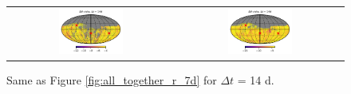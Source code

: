 \documentclass[preprintm,linenumbers]{aastex631}
\begin{document}
\begin{figure}
\begin{tabular}{c c}
         \includegraphics[width=0.4\textwidth]{results/skymaps_cutout/skymaps_cutout_delta_first_year_one_snap_v4_0_10yrs_db_noDD_noTwi_tscale-14_nside-256_doAllTemplateMetrics_reduceCount_g_noDD_noTwi.pdf} &
         \includegraphics[width=0.4\textwidth]{results/skymaps_cutout/skymaps_cutout_delta_first_year_one_snap_v4_0_10yrs_db_noDD_noTwi_tscale-14_nside-256_doAllTemplateMetrics_reduceCount_r_noDD_noTwi.pdf} \\

   \end{tabular}

        \caption{
        Same as Figure \ref{fig:all_together_r_7d} for $\Delta t$ = 14 d. 
        }
        \label{fig:all_together_r_14d}
	\end{figure}

  
\end{document}
